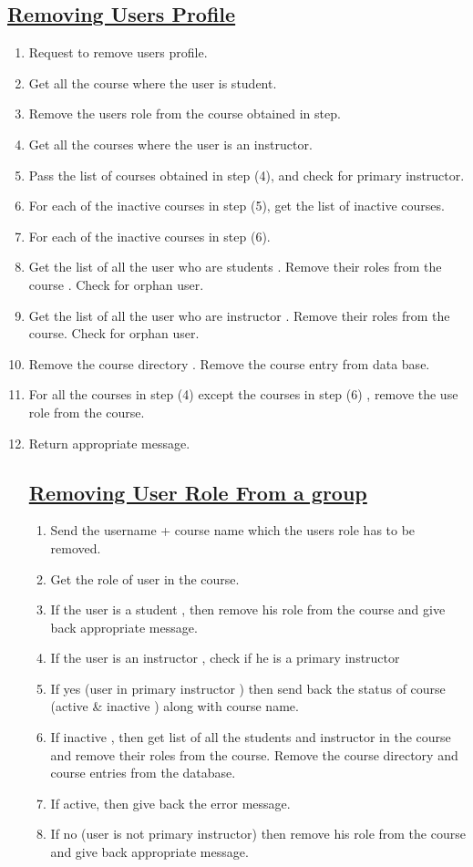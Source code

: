 \documentclass{article}
\begin{document}
\subsection*{\underline{Removing Users Profile}}
\begin{enumerate}
\item Request to remove users profile.
\item Get all the course where the user is student.
\item Remove the users role from the course obtained in step.
\item Get all the courses where the user is an instructor.
\item Pass the list of courses obtained in step (4), and check for primary instructor.
\item For each of the inactive courses in step (5), get the list of inactive courses.
\item For each of the inactive courses in step (6).
\item Get the list of all the user who are students . Remove their roles from the course . Check for orphan user.
\item Get the list of all the user who are instructor . Remove their roles from the course. Check for orphan user.
\item Remove the course directory . Remove the course entry from data base.
\item For all the courses in step (4) except the courses in step (6) , remove the use role from the course.
\item Return appropriate message.
\begin{center}

\end{center}
\subsection*{\underline{Removing User Role From a group}}
\begin{enumerate}
\item Send the username + course name which the users role has to be removed.
\item Get the role of user in the course.
\item If the user is a student , then remove his role from the course and give back appropriate message.
\item If the user is an instructor , check if he is a primary instructor 
\item If yes (user in primary instructor ) then send back the status of course (active \& inactive ) along with course name. 
\item If inactive , then get list of all the students and instructor in the course and remove their roles from the course. Remove the course directory and course entries from the database.
\item If active, then give back the error message.  
\item If no (user is not primary instructor) then remove his role from the course and give back appropriate message.


\end{enumerate}
\end{enumerate}
\end{document}

